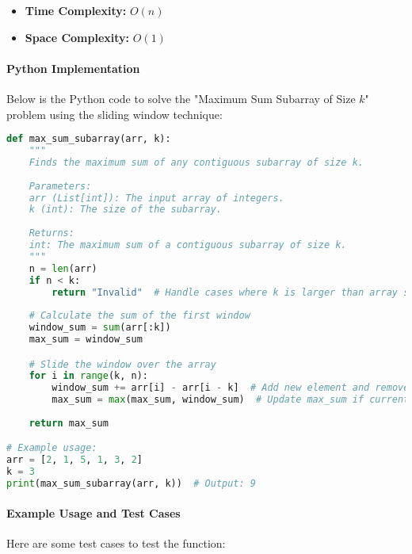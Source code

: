 \begin{itemize}
    \item \textbf{Time Complexity:} \(O(n)\)
    \item \textbf{Space Complexity:} \(O(1)\)
\end{itemize}

\paragraph*{Python Implementation}

Below is the Python code to solve the "Maximum Sum Subarray of Size \(k\)" problem using the sliding window technique:

\begin{fullwidth}
\begin{lstlisting}[language=Python]
def max_sum_subarray(arr, k):
    """
    Finds the maximum sum of any contiguous subarray of size k.
    
    Parameters:
    arr (List[int]): The input array of integers.
    k (int): The size of the subarray.
    
    Returns:
    int: The maximum sum of a contiguous subarray of size k.
    """
    n = len(arr)
    if n < k:
        return "Invalid"  # Handle cases where k is larger than array size
    
    # Calculate the sum of the first window
    window_sum = sum(arr[:k])
    max_sum = window_sum

    # Slide the window over the array
    for i in range(k, n):
        window_sum += arr[i] - arr[i - k]  # Add new element and remove the first element of the previous window
        max_sum = max(max_sum, window_sum)  # Update max_sum if current window_sum is greater
    
    return max_sum

# Example usage:
arr = [2, 1, 5, 1, 3, 2]
k = 3
print(max_sum_subarray(arr, k))  # Output: 9
\end{lstlisting}
\end{fullwidth}

\paragraph*{Example Usage and Test Cases}

Here are some test cases to test the function:

